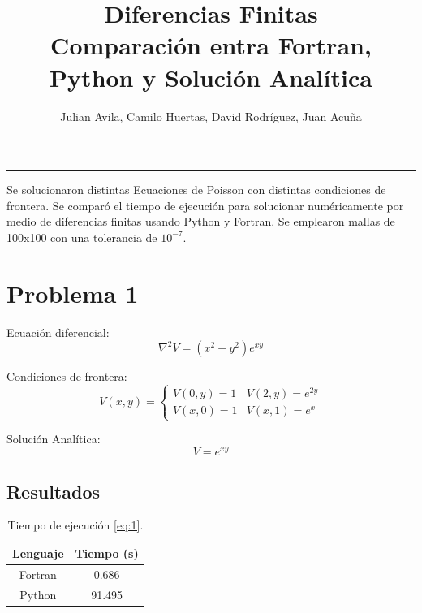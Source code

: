 \documentclass[12pt,a4paper]{article}
\title{\textbf{Diferencias Finitas} \\ \small{Comparación entra Fortran, Python y Solución Analítica}}
\author{Julian Avila, Camilo Huertas, David Rodríguez, Juan Acuña}
\begin{document}
\maketitle
\vspace{-1em}
\hrule
\vspace{1em}

Se solucionaron distintas Ecuaciones de Poisson con distintas
condiciones de frontera.
Se comparó el tiempo de ejecución para solucionar numéricamente por medio de
diferencias finitas usando Python y Fortran.
Se emplearon mallas de 100x100 con una tolerancia de $10^{-7}$.

\section*{Problema 1}%
\label{sec:Problema 1}

Ecuación diferencial:
\begin{equation}
  \nabla^2{V} = \left( x^2 + y^2 \right) e^{xy}
  \label{eq:1}
\end{equation}

Condiciones de frontera:
\begin{equation}
  V(x, y) =
  \begin{cases}
    V(0, y) = 1 & V(2, y) = e^{2y} \\
    V(x, 0) = 1 & V(x, 1) = e^{x}
  \end{cases}
\end{equation}

Solución Analítica:
\begin{equation}
  V = e^{xy}
\end{equation}

\subsection*{Resultados}%
\label{sub:Resultados-1}

\begin{table}[htbp!]
  \centering
  \begin{tabular}{@{}c|S[table-format=2.3]@{}}
    \toprule
    Lenguaje  & {Tiempo (s)} \\
    \midrule
    Fortran & 0.686 \\
    Python & 91.495 \\
    \bottomrule
  \end{tabular}
  \caption{Tiempo de ejecución \cref{eq:1}.}
\end{table}
\end{document}
